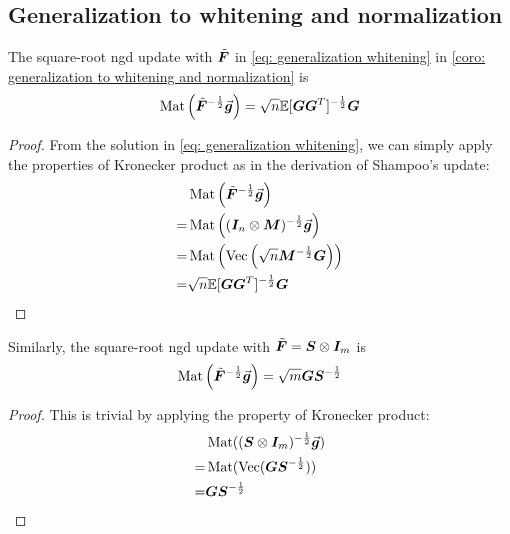 \subsection{Generalization to whitening and normalization}
\label{subapp: update of generalization of whitening}
The square-root \gls{ngd} update with $\tilde{\bm{F}}$ in \cref{eq: generalization whitening} in \cref{coro: generalization to whitening and normalization} is 
\begin{equation}
    \operatorname{Mat}\left(\tilde{\bm{F}}^{-\frac{1}{2}}\vec{\bm{g}}\right) = \sqrt{n}\mathbb{E}[{\bm{G}}{\bm{G}}^T]^{-\frac{1}{2}}{\bm{G}}
\end{equation}
\begin{proof}
    From the solution in \cref{eq: generalization whitening}, we can simply apply the properties of Kronecker product as in the derivation of Shampoo's update:
    \begin{align*}
        &\operatorname{Mat}\left(\tilde{\bm{F}}^{-\frac{1}{2}}\vec{\bm{g}}\right)\\
        =&\operatorname{Mat}\left(({\bm{I}}_n\otimes {\bm{M}})^{-\frac{1}{2}}\vec{\bm{g}}\right)\\
        =&\operatorname{Mat}\left(\operatorname{Vec}\left(\sqrt{n}{\bm{M}}^{-\frac{1}{2}}{\bm{G}}\right)\right)\\
        =& \sqrt{n}\mathbb{E}[{\bm{G}}{\bm{G}}^T]^{-\frac{1}{2}}{\bm{G}}
    \end{align*}
\end{proof}
Similarly, the square-root \gls{ngd} update with $\tilde{\bm{F}}={\bm{S}}\otimes {\bm{I}}_m$ is 
\begin{equation}
    \operatorname{Mat}\left(\tilde{\bm{F}}^{-\frac{1}{2}}\vec{\bm{g}}\right) = \sqrt{m}{\bm{G}}{\bm{S}}^{-\frac{1}{2}}
\end{equation}
\begin{proof}
    This is trivial by applying the property of Kronecker product:
    \begin{align*}
        &\operatorname{Mat}(({\bm{S}}\otimes{\bm{I}}_m)^{-\frac{1}{2}}\vec{\bm{g}})\\
    =& \operatorname{Mat}(\operatorname{Vec}({\bm{G}}{\bm{S}}^{-\frac{1}{2}}))\\
    =&{\bm{G}}{\bm{S}}^{-\frac{1}{2}}
    \end{align*}
\end{proof}
